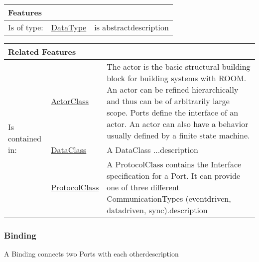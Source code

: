 			\vspace{\baselineskip}
			\begingroup
			\renewcommand{\arraystretch}{1.8} %
			\parbox{\textwidth}{
			\begin{longtable}{l l p{}}
				\multicolumn{2}{l}{\textbf{\large Features}} & \\
				\hline
			Is of type: & \tabitem \hyperlink{ref:DataType}{DataType}  & is abstractdescription\\
			\hline
			\end{longtable}	
			}
			\endgroup
			\vspace{\baselineskip}
			
			\vspace{\baselineskip}
			\begingroup
			\renewcommand{\arraystretch}{1.8} %
			\parbox{\textwidth}{
			\begin{longtable}{l l p{}}
				\multicolumn{2}{l}{\textbf{\large Related Features}} & \\
				\hline
			\multirow{3}{*}{Is contained in:} & \tabitem \hyperlink{ref:ActorClass}{ActorClass}  & The actor is the basic structural building block for building systems with ROOM. An actor can be refined hierarchically and thus can be of arbitrarily large scope. Ports define the interface of an actor. An actor can also have a behavior usually defined by a finite state machine. \\
			& \tabitem \hyperlink{ref:DataClass}{DataClass}  & A DataClass ...description  \\
			& \tabitem \hyperlink{ref:ProtocolClass}{ProtocolClass}  & A ProtocolClass contains the Interface specification for a Port. It can provide one of three different CommunicationTypes (eventdriven, datadriven, sync).description  \\
			\hline
			\end{longtable}	
			}
			\endgroup
			\vspace{\baselineskip}
			
			
		
		\subsubsection{Binding}
			\hypertarget{ref:Binding}{}
			
			A Binding connects two Ports with each otherdescription
			

